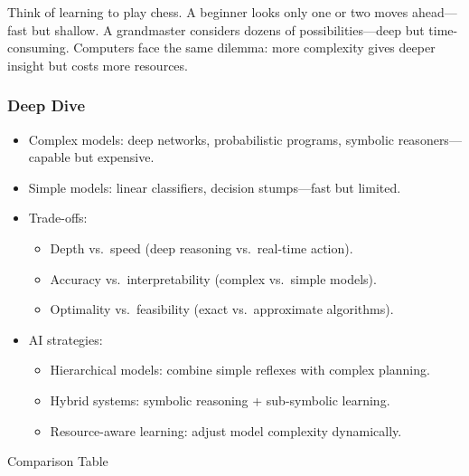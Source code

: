 \documentclass[
  letterpaper,
  DIV=11,
  numbers=noendperiod]{scrreprt}
\providecommand{\tightlist}{%
  \setlength{\itemsep}{0pt}\setlength{\parskip}{0pt}}
\begin{document}
Think of learning to play chess. A beginner looks only one or two moves
ahead---fast but shallow. A grandmaster considers dozens of
possibilities---deep but time-consuming. Computers face the same
dilemma: more complexity gives deeper insight but costs more resources.

\subsubsection{Deep Dive}\label{deep-dive-38}

\begin{itemize}
\item
  Complex models: deep networks, probabilistic programs, symbolic
  reasoners---capable but expensive.
\item
  Simple models: linear classifiers, decision stumps---fast but limited.
\item
  Trade-offs:

  \begin{itemize}
  \tightlist
  \item
    Depth vs.~speed (deep reasoning vs.~real-time action).
  \item
    Accuracy vs.~interpretability (complex vs.~simple models).
  \item
    Optimality vs.~feasibility (exact vs.~approximate algorithms).
  \end{itemize}
\item
  AI strategies:

  \begin{itemize}
  \tightlist
  \item
    Hierarchical models: combine simple reflexes with complex planning.
  \item
    Hybrid systems: symbolic reasoning + sub-symbolic learning.
  \item
    Resource-aware learning: adjust model complexity dynamically.
  \end{itemize}
\end{itemize}

Comparison Table
\end{document}
